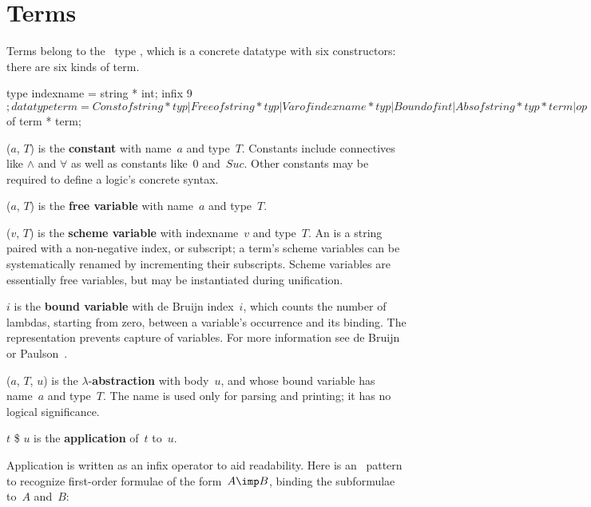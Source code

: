 \section{Terms}
Terms belong to the \ML\ type , which is a concrete datatype
with six constructors: there are six kinds of term.
\begin{ttbox}
type indexname = string * int;
infix 9 $;
datatype term = Const of string * typ
              | Free  of string * typ
              | Var   of indexname * typ
              | Bound of int
              | Abs   of string * typ * term
              | op $  of term * term;
\end{ttbox}
\begin{ttdescription}
\item[\ttindexbold{Const}($a$, $T$)] 
  is the {\bf constant} with name~$a$ and type~$T$.  Constants include
  connectives like $\land$ and $\forall$ as well as constants like~0
  and~$Suc$.  Other constants may be required to define a logic's concrete
  syntax. 

\item[\ttindexbold{Free}($a$, $T$)] 
  is the {\bf free variable} with name~$a$ and type~$T$.

\item[\ttindexbold{Var}($v$, $T$)] 
  is the {\bf scheme variable} with indexname~$v$ and type~$T$.  An
   is a string paired with a non-negative index, or
  subscript; a term's scheme variables can be systematically renamed by
  incrementing their subscripts.  Scheme variables are essentially free
  variables, but may be instantiated during unification.

\item[\ttindexbold{Bound} $i$] 
  is the {\bf bound variable} with de Bruijn index~$i$, which counts the
  number of lambdas, starting from zero, between a variable's occurrence
  and its binding.  The representation prevents capture of variables.  For
  more information see de Bruijn \cite{debruijn72} or
  Paulson~\cite[page~336]{paulson91}.

\item[\ttindexbold{Abs}($a$, $T$, $u$)]
  is the $\lambda$-{\bf abstraction} with body~$u$, and whose bound
  variable has name~$a$ and type~$T$.  The name is used only for parsing
  and printing; it has no logical significance.

\item[$t$ \$ $u$]  
is the {\bf application} of~$t$ to~$u$.  
\end{ttdescription}
Application is written as an infix operator to aid readability.
Here is an \ML\ pattern to recognize first-order formulae of
the form~$A\imp B$, binding the subformulae to~$A$ and~$B$:


